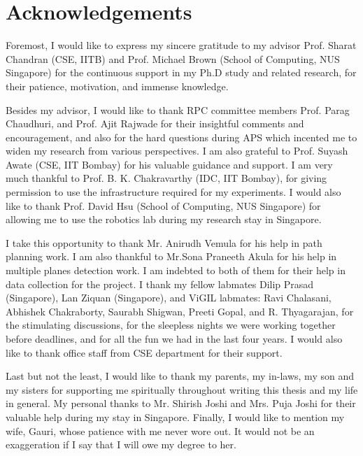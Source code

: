 \chapter*{Acknowledgements}
Foremost, I would like to express my sincere gratitude to my advisor Prof.
Sharat Chandran (CSE, IITB) and Prof. Michael Brown (School of Computing, NUS
Singapore) for the continuous support in my Ph.D study and related research,
for their patience, motivation, and immense knowledge.

Besides my advisor, I would like to thank RPC committee members  Prof. Parag
Chaudhuri, and Prof. Ajit Rajwade for their insightful comments and
encouragement, and also for the hard questions during APS which incented me to
widen my research from various perspectives. I am also grateful to Prof. Suyash
Awate (CSE, IIT Bombay) for his valuable guidance and support. I am very much
thankful to Prof. B. K. Chakravarthy (IDC, IIT Bombay), for giving permission
to use the infrastructure required for my experiments. I would also like to
thank Prof. David Hsu (School of Computing, NUS Singapore) for allowing me to
use the robotics lab during my research stay in Singapore.

I take this opportunity to thank Mr. Anirudh Vemula for his help in path
planning work. I am also thankful to Mr.Sona Praneeth Akula for his help in multiple planes
detection work. I am indebted to both of them for their help in data collection
for the project. I thank my fellow labmates Dilip Prasad (Singapore), Lan Ziquan (Singapore),
and ViGIL labmates: Ravi Chalasani, Abhishek Chakraborty,  Saurabh Shigwan,
Preeti Gopal, and R. Thyagarajan, for the stimulating discussions, for the
sleepless nights we were working together before deadlines, and for all the fun
we had in the last four years. I would also like to thank office staff from CSE
department for their support. 

Last but not the least, I would like to thank my parents, my in-laws, my son and
my sisters for supporting me spiritually throughout writing this thesis and my 
life in general. My personal thanks to Mr. Shirish Joshi and Mrs. Puja Joshi
for their valuable help during my stay in Singapore. Finally, I would like to
mention my wife, Gauri, whose patience with me never wore out. It would not be
an exaggeration if I say that I will owe my degree to her.